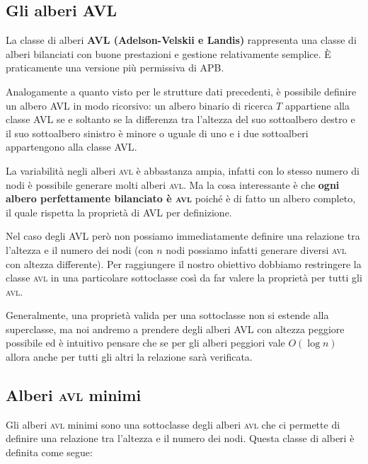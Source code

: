 \subsection{Gli alberi AVL}
La classe di alberi \textbf{AVL (Adelson-Velskii e Landis)} rappresenta una classe di alberi bilanciati con buone prestazioni e gestione relativamente semplice. È praticamente una versione più permissiva di \textsc{APB}.


Analogamente a quanto visto per le strutture dati precedenti, è possibile definire un albero AVL in modo ricorsivo: un albero binario di ricerca $T$ appartiene alla classe \textsc{AVL} se e soltanto se la differenza tra l'altezza del suo sottoalbero destro e il suo sottoalbero sinistro è minore o uguale di uno e i due sottoalberi appartengono alla classe \textsc{AVL}.

La variabilità negli alberi \textsc{avl} è abbastanza ampia, infatti con lo stesso numero di nodi è possibile generare molti alberi \textsc{avl}. Ma la cosa interessante è che \textbf{ogni albero perfettamente bilanciato è \textsc{avl}} poiché è di fatto un albero completo, il quale rispetta la proprietà di AVL per definizione.

Nel caso degli AVL però non possiamo immediatamente definire una relazione tra l’altezza e il numero dei nodi (con $n$ nodi possiamo infatti generare diversi \textsc{avl} con altezza differente). Per raggiungere il nostro obiettivo dobbiamo restringere la classe \textsc{avl} in una particolare sottoclasse così da far valere la proprietà per tutti gli \textsc{avl}.

Generalmente, una proprietà valida per una sottoclasse non si estende alla superclasse, ma noi andremo a prendere degli alberi AVL con altezza peggiore possibile ed è intuitivo pensare che se per gli alberi peggiori vale $O(\log n)$ allora anche per tutti gli altri la relazione sarà verificata.


\subsection{Alberi \textsc{avl} minimi}
Gli alberi \textsc{avl} minimi sono una sottoclasse degli alberi \textsc{avl} che ci permette di definire una relazione tra l’altezza e il numero dei nodi. Questa classe di alberi è definita come segue:


